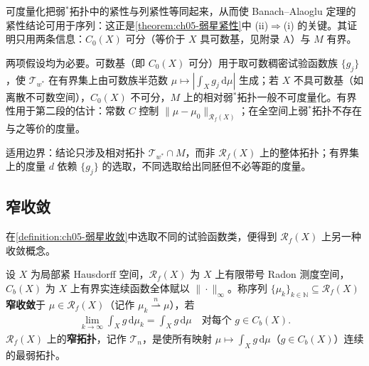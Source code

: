 \documentclass[../../main.tex]{subfiles}%
\begin{document}
\begin{remark}\label{remark:ch05-弱星可度量化动机}
可度量化把弱$^*$拓扑中的紧性与列紧性等同起来，从而使 Banach–Alaoglu 定理的紧性结论可用于序列：这正是\cref{theorem:ch05-弱星紧性}中 (ii)$\Rightarrow$(i) 的关键。其证明只用两条信息：$C_0(X)$ 可分（等价于 $X$ 具可数基，见附录 A）与 $M$ 有界。

两项假设均为必要。可数基（即 $C_0(X)$ 可分）用于取可数稠密试验函数族 $\{g_j\}$，使 $\mathcal{T}_{w^*}$ 在有界集上由可数族半范数 $\mu\mapsto\left|\int_X g_j\,\mathrm{d}\mu\right|$ 生成；若 $X$ 不具可数基（如离散不可数空间），$C_0(X)$ 不可分，$M$ 上的相对弱$^*$拓扑一般不可度量化。有界性用于第二段的估计：常数 $C$ 控制 $\|\mu-\mu_0\|_{\mathscr{R}_f(X)}$；在全空间上弱$^*$拓扑不存在与之等价的度量。

适用边界：结论只涉及相对拓扑 $\mathcal{T}_{w^*}\cap M$，而非 $\mathscr{R}_f(X)$ 上的整体拓扑；有界集上的度量 $d$ 依赖 $\{g_j\}$ 的选取，不同选取给出同胚但不必等距的度量。
\end{remark}

\subsection{窄收敛}\label{subsection:ch05-窄收敛}

在\cref{definition:ch05-弱星收敛}中选取不同的试验函数类，便得到 $\mathscr{R}_f(X)$ 上另一种收敛概念。

\begin{definition}\label{definition:ch05-窄收敛}
设 $X$ 为局部紧 Hausdorff 空间，$\mathscr{R}_f(X)$ 为 $X$ 上有限带号 Radon 测度空间，$C_b(X)$ 为 $X$ 上有界实连续函数全体赋以 $\|\cdot\|_\infty$。称序列 $\{\mu_k\}_{k\in\mathbb{N}}\subseteq\mathscr{R}_f(X)$ \textbf{窄收敛}于 $\mu\in\mathscr{R}_f(X)$（记作 $\mu_k\stackrel{n}{\rightharpoonup}\mu$），若
\begin{align}
\lim_{k\to\infty}\int_X g\,\mathrm{d}\mu_k=\int_X g\,\mathrm{d}\mu
\quad\text{对每个 }g\in C_b(X).\label{align:ch05-5.3}
\end{align}
$\mathscr{R}_f(X)$ 上的\textbf{窄拓扑}，记作 $\mathcal{T}_n$，是使所有映射 $\mu\mapsto\int_X g\,\mathrm{d}\mu$（$g\in C_b(X)$）连续的最弱拓扑。
\end{definition}
\end{document}
